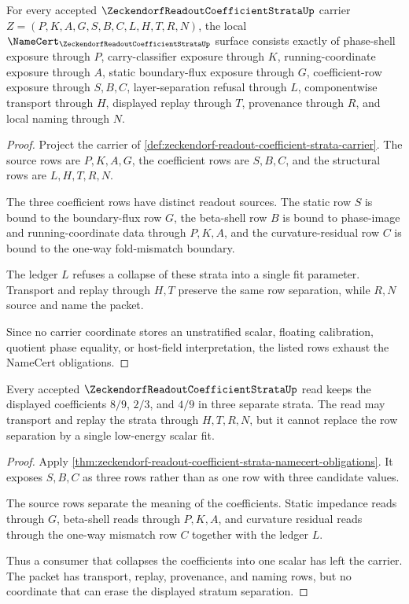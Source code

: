 \begin{theorem}
\label{thm:zeckendorf-readout-coefficient-strata-namecert-obligations}
For every accepted $\ZeckendorfReadoutCoefficientStrataUp$ carrier $Z=(P,K,A,G,S,B,C,L,H,T,R,N)$, the local $\NameCert_{\ZeckendorfReadoutCoefficientStrataUp}$ surface consists exactly of phase-shell exposure through $P$, carry-classifier exposure through $K$, running-coordinate exposure through $A$, static boundary-flux exposure through $G$, coefficient-row exposure through $S,B,C$, layer-separation refusal through $L$, componentwise transport through $H$, displayed replay through $T$, provenance through $R$, and local naming through $N$.
\end{theorem}
\begin{proof}
Project the carrier of \autoref{def:zeckendorf-readout-coefficient-strata-carrier}. The source rows are $P,K,A,G$, the coefficient rows are $S,B,C$, and the structural rows are $L,H,T,R,N$.

The three coefficient rows have distinct readout sources. The static row $S$ is bound to the boundary-flux row $G$, the beta-shell row $B$ is bound to phase-image and running-coordinate data through $P,K,A$, and the curvature-residual row $C$ is bound to the one-way fold-mismatch boundary.

The ledger $L$ refuses a collapse of these strata into a single fit parameter. Transport and replay through $H,T$ preserve the same row separation, while $R,N$ source and name the packet.

Since no carrier coordinate stores an unstratified scalar, floating calibration, quotient phase equality, or host-field interpretation, the listed rows exhaust the NameCert obligations.
\end{proof}

\begin{theorem}
\label{thm:zeckendorf-readout-coefficient-strata-separation}
Every accepted $\ZeckendorfReadoutCoefficientStrataUp$ read keeps the displayed coefficients $8/9$, $2/3$, and $4/9$ in three separate strata. The read may transport and replay the strata through $H,T,R,N$, but it cannot replace the row separation by a single low-energy scalar fit.
\end{theorem}
\begin{proof}
Apply \autoref{thm:zeckendorf-readout-coefficient-strata-namecert-obligations}. It exposes $S,B,C$ as three rows rather than as one row with three candidate values.

The source rows separate the meaning of the coefficients. Static impedance reads through $G$, beta-shell reads through $P,K,A$, and curvature residual reads through the one-way mismatch row $C$ together with the ledger $L$.

Thus a consumer that collapses the coefficients into one scalar has left the carrier. The packet has transport, replay, provenance, and naming rows, but no coordinate that can erase the displayed stratum separation.
\end{proof}

